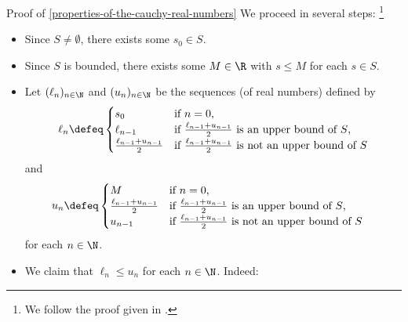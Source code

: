 \begin{Proof}{Proof of \cref{properties-of-the-cauchy-real-numbers}}
    We proceed in several steps:%
    \footnote{%
        We follow the proof given in \cite[Theorem 4.13]{kemp:cauchy-s-construction-of-r}.
        \par\vspace*{\TCBBoxCorrection}
    }%
    \begin{itemize}
        \item Since $S\neq\emptyset$, there exists some $s_{0}\in S$.
        \item Since $S$ is bounded, there exists some $M\in\R$ with $s\leq M$ for each $s\in S$.
        \item Let $(\ell_{n})_{n\in\N}$ and $(u_{n})_{n\in\N}$ be the sequences (of real numbers) defined by
            \begin{align*}
                \ell_{n} &\defeq \begin{cases}
                                     s_{0}                        &\text{if $n=0$,}\\
                                     \ell_{n-1}                   &\text{if $\frac{\ell_{n-1}+u_{n-1}}{2}$ is an upper bound of $S$,}\\
                                     \frac{\ell_{n-1}+u_{n-1}}{2} &\text{if $\frac{\ell_{n-1}+u_{n-1}}{2}$ is not an upper bound of $S$}
                                 \end{cases}\\
            \end{align*}
            and
            \begin{align*}
                u_{n}    &\defeq \begin{cases}
                                     M                            &\text{if $n=0$,}\\
                                     \frac{\ell_{n-1}+u_{n-1}}{2} &\text{if $\frac{\ell_{n-1}+u_{n-1}}{2}$ is an upper bound of $S$,}\\
                                     u_{n-1}                      &\text{if $\frac{\ell_{n-1}+u_{n-1}}{2}$ is not an upper bound of $S$}
                                 \end{cases}
            \end{align*}
            for each $n\in\N$.
        \item We claim that $\ell_{n}\leq u_{n}$ for each $n\in\N$. Indeed:

\end{itemize}
\end{Proof}
